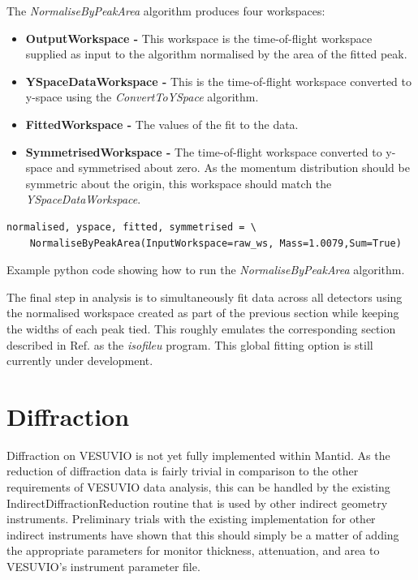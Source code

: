 \documentclass[paper=a4, fontsize=11pt]{scrartcl}	%
\numberwithin{equation}{section}															%
\numberwithin{figure}{section}																%
\numberwithin{table}{section}
\begin{document}
The \textit{NormaliseByPeakArea} algorithm produces four workspaces:

\begin{itemize}
\item \textbf{OutputWorkspace - } This workspace is the time-of-flight workspace supplied as input to the algorithm normalised by the area of the fitted peak.
\item \textbf{YSpaceDataWorkspace - } This is the time-of-flight workspace converted to y-space using the \textit{ConvertToYSpace} algorithm.
\item \textbf{FittedWorkspace - } The values of the fit to the data.
\item \textbf{SymmetrisedWorkspace - } The time-of-flight workspace converted to y-space and symmetrised about zero. As the momentum distribution should be symmetric about the origin, this workspace should match the \textit{YSpaceDataWorkspace}.
\end{itemize}

\begin{listing}[H]
\begin{verbatim}
normalised, yspace, fitted, symmetrised = \
	NormaliseByPeakArea(InputWorkspace=raw_ws, Mass=1.0079,Sum=True)
\end{verbatim}
\caption{Example python code showing how to run the \textit{NormaliseByPeakArea} algorithm.}
\label{lst:normalise-peak-area}
\end{listing}

The final step in analysis is to simultaneously fit data across all detectors using the normalised workspace created as part of the previous section while keeping the widths of each peak tied. This roughly emulates the corresponding section described in Ref. \cite{mayers2010user} as the \textit{isofileu} program. This global fitting option is still currently under development.


\section{Diffraction}
\label{sec:diffraction}
Diffraction on VESUVIO is not yet fully implemented within Mantid. As the reduction of diffraction data is fairly trivial in comparison to the other requirements of VESUVIO data analysis, this can be handled by the existing IndirectDiffractionReduction routine that is used by other indirect geometry instruments. Preliminary trials with the existing implementation for other indirect instruments have shown that this should simply be a matter of adding the appropriate parameters for monitor thickness, attenuation, and area to VESUVIO's instrument parameter file.
\end{document}
